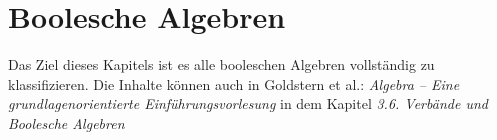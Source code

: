 \chapter{Boolesche Algebren}

Das Ziel dieses Kapitels ist es alle booleschen Algebren vollständig zu klassifizieren. Die Inhalte können auch in Goldstern et al.: \textit{Algebra -- Eine grundlagenorientierte Einführungsvorlesung} in dem Kapitel \textit{3.6. Verbände und Boolesche Algebren}


